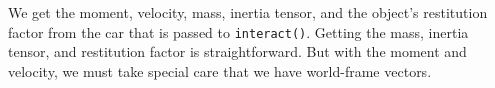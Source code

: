 \documentclass{article}
\begin{document}
We get the moment, velocity, mass, inertia tensor, and the object's
restitution factor from the car that is passed to \verb#interact()#.
Getting the mass, inertia tensor, and restitution factor is
straightforward.  But with the moment and velocity, we must take
special care that we have world-frame vectors.
\end{document}
